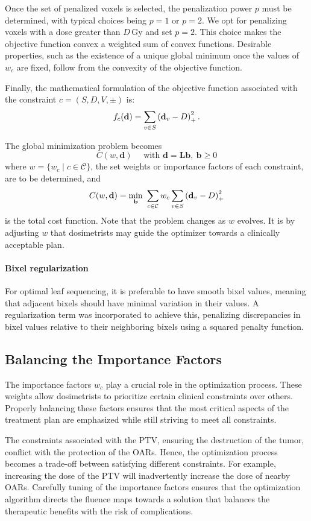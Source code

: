 Once the set of penalized voxels is selected, the penalization power $p$ must be determined, with typical choices being $p=1$ or $p=2$.
We opt for penalizing voxels with a dose greater than $D\,\text{Gy}$ and set $p=2$.
This choice makes the objective function convex a weighted sum of convex functions.
Desirable properties, such as the existence of a unique global minimum once the values of $w_c$ are fixed, follow from the convexity of the objective function.

Finally, the mathematical formulation of the objective function associated with the constraint $c = \left( S, D, V, \pm \right)$ is:
$$f_c(\mathbf{d}) = \sum_{v \in S} \left( {\mathbf{d}_v - D} \right)_+^2.$$

The global minimization problem becomes
$$
C(w, \mathbf{d})
\quad \text{ with }
\mathbf{d} = \textbf{L}\mathbf{b}, \ \mathbf{b} \geq 0
$$
where $w = \{ w_c \mid c \in \mathcal{C} \}$, the set weights or importance factors of each constraint, are to be determined, and 
$$
C(w, \mathbf{d}) =
\min_{\mathbf{b}} \ \sum_{c \in \mathcal{C}} w_c \sum_{v \in S} \left( {\mathbf{d}_v - D} \right)_+^2$$ is the total cost function.
Note that the problem changes as $w$ evolves.
It is by adjusting $w$ that dosimetrists may guide the optimizer towards a clinically acceptable plan.


\paragraph{Bixel regularization}
For optimal leaf sequencing, it is preferable to have smooth bixel values, meaning that adjacent bixels should have minimal variation in their values.
A regularization term was incorporated to achieve this, penalizing discrepancies in bixel values relative to their neighboring bixels using a squared penalty function.

\subsection{Balancing the Importance Factors}
The importance factors $w_c$ play a crucial role in the optimization process.
These weights allow dosimetrists to prioritize certain clinical constraints over others.
Properly balancing these factors ensures that the most critical aspects of the treatment plan are emphasized while still striving to meet all constraints.

The constraints associated with the PTV, ensuring the destruction of the tumor, conflict with the protection of the OARs.
Hence, the optimization process becomes a trade-off between satisfying different constraints.
For example, increasing the dose of the PTV will inadvertently increase the dose of nearby OARs.
Carefully tuning of the importance factors ensures that the optimization algorithm directs the fluence maps towards a solution that balances the therapeutic benefits with the risk of complications.

